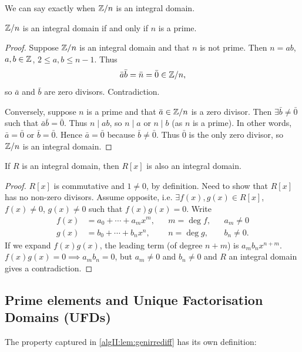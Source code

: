 \documentclass[10pt, a4paper]{article}
\begin{document}
We can say exactly when $\mathbb{Z} / n$ is an integral domain.
\begin{lemma}
    $\mathbb{Z} / n$ is an integral domain if and only if $n$ is a prime.

    \begin{proof}
        Suppose $\mathbb{Z} / n$ is an integral domain and that $n$ is not prime.
        Then $n = ab$,
        $a, b \in \mathbb{Z}$,
        $2 \leq a, b \leq n - 1$.
        Thus
        \[
        \bar{a}\bar{b} = \bar{n} = \bar{0} \in \mathbb{Z} / n,
        \]
        so $\bar{a}$ and $\bar{b}$ are zero divisors.
        Contradiction.

        Conversely,
        suppose $n$ is a prime and that $\bar{a} \in \mathbb{Z} / n$ is a zero divisor.
        Then $\exists \bar{b} \neq \bar{0}$ such that $\bar{a}\bar{b} = \bar{0}$.
        Thus $n \mid ab$,
        so $n \mid a$ or $n \mid b$
        (as $n$ is a prime).
        In other words,
        $\bar{a} = \bar{0}$ or $\bar{b} = \bar{0}$.
        Hence $\bar{a} = \bar{0}$ because $\bar{b} \neq \bar{0}$.
        Thus $\bar{0}$ is the only zero divisor,
        so $\mathbb{Z} / n$ is an integral domain.
    \end{proof}
\end{lemma}

\begin{proposition}
    If $R$ is an integral domain,
    then $R[x]$ is also an integral domain.

    \begin{proof}
        $R[x]$ is commutative and $1 \neq 0$,
        by definition.
        Need to show that $R[x]$ has no non-zero divisors.
        Assume opposite,
        i.e. $\exists f(x), g(x) \in R[x]$,
        $f(x) \neq 0$,
        $g(x) \neq 0$ such that $f(x)g(x) = 0$.
        Write
        \begin{align*}
            f(x) &= a_0 + \dotsi + a_mx ^ m, && m = \deg{f}, && a_m \neq 0 \\
            g(x) &= b_0 + \dotsi + b_nx ^ n, && n = \deg{g}, && b_n \neq 0.
        \end{align*}
        If we expand $f(x)g(x)$,
        the leading term
        (of degree $n + m$)
        is $a_mb_nx ^ {n + m}$.
        $f(x)g(x) = 0 \implies a_mb_n = 0$,
        but $a_m \neq 0$ and $b_n \neq 0$ and $R$ an integral domain gives a contradiction.
    \end{proof}
\end{proposition}

\subsection{Prime elements and Unique Factorisation Domains
    (UFDs)}
The property captured in \autoref{algII:lem:genirrediff} has its own definition:
\end{document}
